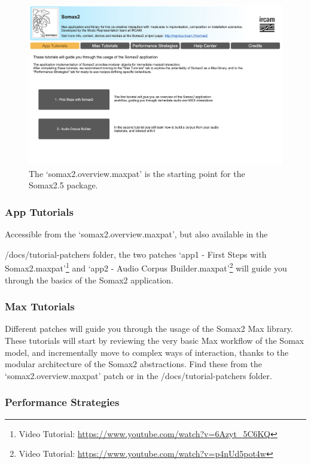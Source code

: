  \begin{figure}[h!]
    \centering        
 	\includegraphics[width=1\textwidth, keepaspectratio]{img/somax2_overview.png}
    \caption{The `somax2.overview.maxpat' is the starting point for the Somax2.5 package.}
    \label{fig:overview}
\end{figure}

\subsubsection{App Tutorials}

Accessible from the `somax2.overview.maxpat', but also available in the 

/docs/tutorial-patchers folder, the two patches `app1 - First Steps with Somax2.maxpat'\footnote{Video Tutorial: \url{https://www.youtube.com/watch?v=6Azyt_5C6KQ}} and `app2 - Audio Corpus Builder.maxpat'\footnote{Video Tutorial: \url{https://www.youtube.com/watch?v=p4nUd5pot4w}} will guide you through the basics of the Somax2 application.

\subsubsection{Max Tutorials}

Different patches will guide you through the usage of the Somax2 Max library. These tutorials will start by reviewing the very basic Max workflow of the Somax model, and incrementally move to complex ways of interaction, thanks to the modular architecture of the Somax2 abstractions. Find these from the `somax2.overview.maxpat' patch or in the /docs/tutorial-patchers folder.

\subsubsection{Performance Strategies}

